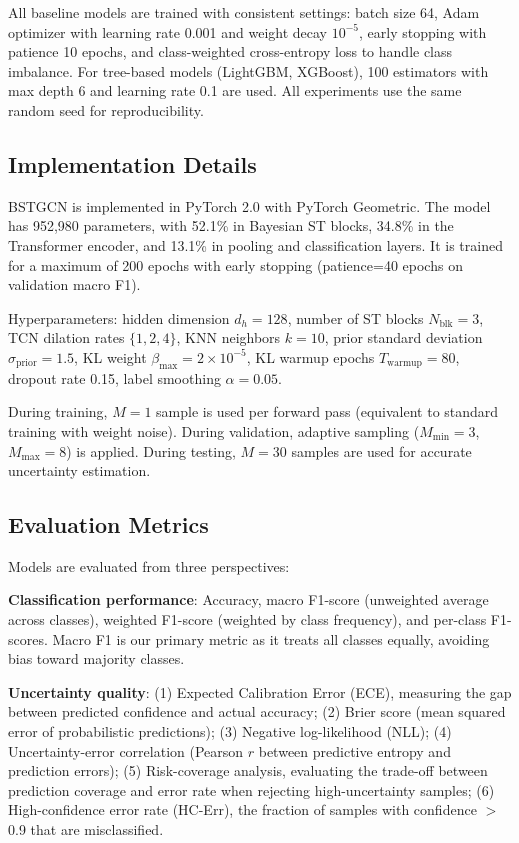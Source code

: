 \documentclass[lettersize,journal]{IEEEtran}
\begin{document}
All baseline models are trained with consistent settings: batch size 64, Adam optimizer with learning rate 0.001 and weight decay $10^{-5}$, early stopping with patience 10 epochs, and class-weighted cross-entropy loss to handle class imbalance. For tree-based models (LightGBM, XGBoost), 100 estimators with max depth 6 and learning rate 0.1 are used. All experiments use the same random seed for reproducibility.

\subsection{Implementation Details}

BSTGCN is implemented in PyTorch 2.0 with PyTorch Geometric. The model has 952,980 parameters, with 52.1\% in Bayesian ST blocks, 34.8\% in the Transformer encoder, and 13.1\% in pooling and classification layers. It is trained for a maximum of 200 epochs with early stopping (patience=40 epochs on validation macro F1). 

Hyperparameters: hidden dimension $d_h=128$, number of ST blocks $N_{\text{blk}}=3$, TCN dilation rates $\{1, 2, 4\}$, KNN neighbors $k=10$, prior standard deviation $\sigma_{\text{prior}}=1.5$, KL weight $\beta_{\max}=2\times10^{-5}$, KL warmup epochs $T_{\text{warmup}}=80$, dropout rate 0.15, label smoothing $\alpha=0.05$.

During training, $M=1$ sample is used per forward pass (equivalent to standard training with weight noise). During validation, adaptive sampling ($M_{\min}=3$, $M_{\max}=8$) is applied. During testing, $M=30$ samples are used for accurate uncertainty estimation.

\subsection{Evaluation Metrics}

Models are evaluated from three perspectives:

\textbf{Classification performance}: Accuracy, macro F1-score (unweighted average across classes), weighted F1-score (weighted by class frequency), and per-class F1-scores. Macro F1 is our primary metric as it treats all classes equally, avoiding bias toward majority classes.

\textbf{Uncertainty quality}: (1) Expected Calibration Error (ECE), measuring the gap between predicted confidence and actual accuracy; (2) Brier score (mean squared error of probabilistic predictions); (3) Negative log-likelihood (NLL); (4) Uncertainty-error correlation (Pearson $r$ between predictive entropy and prediction errors); (5) Risk-coverage analysis, evaluating the trade-off between prediction coverage and error rate when rejecting high-uncertainty samples; (6) High-confidence error rate (HC-Err), the fraction of samples with confidence $>$0.9 that are misclassified.
\end{document}
